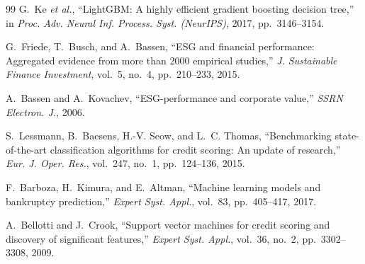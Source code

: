\documentclass[conference]{IEEEtran}
\begin{document}
\begin{thebibliography}{99}
G.~Ke \emph{et al.}, ``LightGBM: A highly efficient gradient boosting decision
tree,'' in \emph{Proc. Adv. Neural Inf. Process. Syst. (NeurIPS)}, 2017,
pp.~3146--3154.

G.~Friede, T.~Busch, and A.~Bassen, ``ESG and financial performance: Aggregated
evidence from more than 2000 empirical studies,'' \emph{J. Sustainable Finance
Investment}, vol.~5, no.~4, pp.~210--233, 2015.

A.~Bassen and A.~Kovachev, ``ESG-performance and corporate value,'' \emph{SSRN
Electron. J.}, 2006.

S.~Lessmann, B.~Baesens, H.-V. Seow, and L.~C. Thomas, ``Benchmarking
state-of-the-art classification algorithms for credit scoring: An update of
research,'' \emph{Eur. J. Oper. Res.}, vol.~247, no.~1, pp.~124--136, 2015.

F.~Barboza, H.~Kimura, and E.~Altman, ``Machine learning models and bankruptcy
prediction,'' \emph{Expert Syst. Appl.}, vol.~83, pp.~405--417, 2017.

A.~Bellotti and J.~Crook, ``Support vector machines for credit scoring and
discovery of significant features,'' \emph{Expert Syst. Appl.}, vol.~36, no.~2,
pp.~3302--3308, 2009.

\end{thebibliography}
\end{document}
